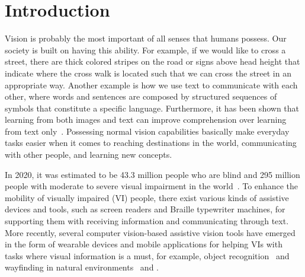 
\chapter{Introduction}
\label{chap:introduction}

Vision is probably the most important of all senses that humans possess. Our society is built on having this ability. For example, if we would like to cross a street, there are thick colored stripes on the road or signs above head height that indicate where the cross walk is located such that we can cross the street in an appropriate way. Another example is how we use text to communicate with each other, where words and sentences are composed by structured sequences of symbols that constitute a specific language. 
Furthermore, it has been shown that learning from both images and text can improve comprehension over learning from text only~\cite{eitel2013picture, hibbing2003picture}. 
Possessing normal vision capabilities basically make everyday tasks easier when it comes to reaching destinations in the world, communicating with other people, and learning new concepts.  

In 2020, it was estimated to be 43.3 million people who are blind and 295 million people with moderate to severe visual impairment in the world~\cite{bourne2021trends}. To enhance the mobility of visually impaired (VI) people, there exist various kinds of assistive devices and tools, such as screen readers and Braille typewriter machines, for supporting them with receiving information and communicating through text. More recently, several computer vision-based assistive vision tools have emerged in the form of wearable devices and mobile applications for helping VIs with tasks where visual information is a must, for example, object recognition~\cite{ahmetovic2020recog, jafri2014computer, kacorri2017teachable} and wayfinding in natural environments~\cite{coughlan2009functional, kacorri2018environmental, loomis2020assisting} and . 

